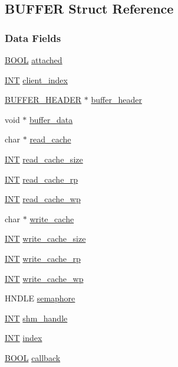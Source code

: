 \subsection{BUFFER Struct Reference}
\label{structBUFFER}
\subsubsection*{Data Fields}
\begin{DoxyCompactItemize}
\item 
\hyperlink{vt2_8h_a239c7f0d40651c3e419c5b9651507d14}{BOOL} \hyperlink{structBUFFER_a495ba8d2558dac6d40a46564c5067a2c}{attached}
\item 
\hyperlink{vppg_8h_a392e62da233ed3e2f7c3fd4f487a3896}{INT} \hyperlink{structBUFFER_a4deee805992cb9841283440fb95d8a81}{client\_\-index}
\item 
\hyperlink{structBUFFER__HEADER}{BUFFER\_\-HEADER} $\ast$ \hyperlink{structBUFFER_a9df49f2ae2aae272c18d34e4cc5a5e94}{buffer\_\-header}
\item 
void $\ast$ \hyperlink{structBUFFER_a8a66c13998d446c0a1bad0b5d4a2d248}{buffer\_\-data}
\item 
char $\ast$ \hyperlink{structBUFFER_a5d4cfe9131aaa09843127a5b134215c5}{read\_\-cache}
\item 
\hyperlink{vppg_8h_a392e62da233ed3e2f7c3fd4f487a3896}{INT} \hyperlink{structBUFFER_aacd1ded35cffe15d8607b92875036bf5}{read\_\-cache\_\-size}
\item 
\hyperlink{vppg_8h_a392e62da233ed3e2f7c3fd4f487a3896}{INT} \hyperlink{structBUFFER_a1c3ec0bf54a65a805455b0cb522d8fea}{read\_\-cache\_\-rp}
\item 
\hyperlink{vppg_8h_a392e62da233ed3e2f7c3fd4f487a3896}{INT} \hyperlink{structBUFFER_ab83ba3496676cf0cafe65c78bcb9a049}{read\_\-cache\_\-wp}
\item 
char $\ast$ \hyperlink{structBUFFER_a99f8e53c723d75ba23267ae71309c6e7}{write\_\-cache}
\item 
\hyperlink{vppg_8h_a392e62da233ed3e2f7c3fd4f487a3896}{INT} \hyperlink{structBUFFER_a88f5da13720c678e5d2facd5a61e15be}{write\_\-cache\_\-size}
\item 
\hyperlink{vppg_8h_a392e62da233ed3e2f7c3fd4f487a3896}{INT} \hyperlink{structBUFFER_a70b3193c3c9315051f94e478bba3ae58}{write\_\-cache\_\-rp}
\item 
\hyperlink{vppg_8h_a392e62da233ed3e2f7c3fd4f487a3896}{INT} \hyperlink{structBUFFER_ac088f845fc97e9ce149b36a94644a9b4}{write\_\-cache\_\-wp}
\item 
HNDLE \hyperlink{structBUFFER_a01ca98491bd74578416427054075fc3d}{semaphore}
\item 
\hyperlink{vppg_8h_a392e62da233ed3e2f7c3fd4f487a3896}{INT} \hyperlink{structBUFFER_ae313313f5d3caa148ea750395c88a54f}{shm\_\-handle}
\item 
\hyperlink{vppg_8h_a392e62da233ed3e2f7c3fd4f487a3896}{INT} \hyperlink{structBUFFER_a5e76aa98957c2f9c714ae9825ef4bb94}{index}
\item 
\hyperlink{vt2_8h_a239c7f0d40651c3e419c5b9651507d14}{BOOL} \hyperlink{structBUFFER_a9611e4a4e83bdf10fc85a02c6de72da5}{callback}
\end{DoxyCompactItemize}


